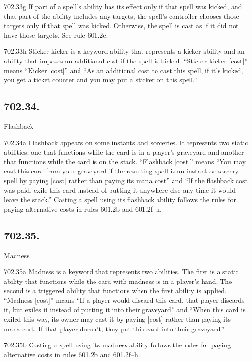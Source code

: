 702.33g If part of a spell’s ability has its effect only if that spell was kicked, and that part of the ability includes any targets, the spell’s controller chooses those targets only if that spell was kicked. Otherwise, the spell is cast as if it did not have those targets. See rule 601.2c.

702.33h Sticker kicker is a keyword ability that represents a kicker ability and an ability that imposes an additional cost if the spell is kicked. “Sticker kicker [cost]” means “Kicker [cost]” and “As an additional cost to cast this spell, if it’s kicked, you get a ticket counter and you may put a sticker on this spell.”

\subsection*{702.34.}
Flashback

702.34a Flashback appears on some instants and sorceries. It represents two static abilities: one that functions while the card is in a player’s graveyard and another that functions while the card is on the stack. “Flashback [cost]” means “You may cast this card from your graveyard if the resulting spell is an instant or sorcery spell by paying [cost] rather than paying its mana cost” and “If the flashback cost was paid, exile this card instead of putting it anywhere else any time it would leave the stack.” Casting a spell using its flashback ability follows the rules for paying alternative costs in rules 601.2b and 601.2f–h.

\subsection*{702.35.}
Madness

702.35a Madness is a keyword that represents two abilities. The first is a static ability that functions while the card with madness is in a player’s hand. The second is a triggered ability that functions when the first ability is applied. “Madness [cost]” means “If a player would discard this card, that player discards it, but exiles it instead of putting it into their graveyard” and “When this card is exiled this way, its owner may cast it by paying [cost] rather than paying its mana cost. If that player doesn’t, they put this card into their graveyard.”

702.35b Casting a spell using its madness ability follows the rules for paying alternative costs in rules 601.2b and 601.2f–h.

